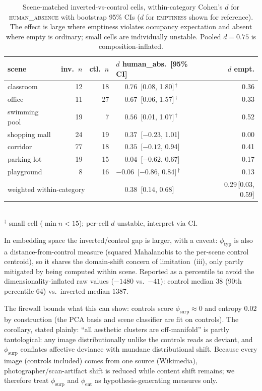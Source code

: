 \documentclass[11pt]{article}
\begin{document}
\begin{table}[htbp]
\centering
\caption{Scene-matched inverted-vs-control cells, within-category Cohen's $d$ for
\textsc{human\_absence} with bootstrap 95\% CIs ($d$ for \textsc{emptiness} shown for
reference). The effect is large where emptiness violates occupancy expectation and absent
where empty is ordinary; small cells are individually unstable. Pooled $d=0.75$ is
composition-inflated.}
\label{tab:scenematch}
\small
\begin{tabular}{lrrlr}
\toprule
scene & inv.\ $n$ & ctl.\ $n$ & $d$ human\_abs.\ [95\% CI] & $d$ empt. \\
\midrule
classroom     & 12 & 18 & $\phantom{-}0.76$ \,[0.08, 1.80]\,$^\dagger$ & 0.36 \\
office        & 11 & 27 & $\phantom{-}0.67$ \,[0.06, 1.57]\,$^\dagger$ & 0.33 \\
swimming pool & 19 & 7  & $\phantom{-}0.56$ \,[0.01, 1.07]\,$^\dagger$ & 0.52 \\
shopping mall & 24 & 19 & $\phantom{-}0.37$ \,[$-0.23$, 1.01] & 0.00 \\
corridor      & 77 & 18 & $\phantom{-}0.35$ \,[$-0.12$, 0.94] & 0.41 \\
parking lot   & 19 & 15 & $\phantom{-}0.04$ \,[$-0.62$, 0.67] & 0.17 \\
playground    & 8  & 16 & $-0.06$ \,[$-0.86$, 0.84]\,$^\dagger$ & 0.13 \\
\midrule
\multicolumn{3}{l}{weighted within-category} & $\phantom{-}0.38$ \,[0.14, 0.68] & 0.29\,[0.03, 0.59] \\
\bottomrule
\end{tabular}\\[2pt]
{\footnotesize $^\dagger$ small cell ($\min n<15$); per-cell $d$ unstable, interpret via CI.}
\end{table}

In embedding space the inverted/control gap is larger, with a caveat:
$\phi_{\text{typ}}$ is also a distance-from-control measure (squared Mahalanobis to the
per-scene control centroid), so it shares the domain-shift concern of
limitation~(iii), only partly mitigated by being computed within scene. Reported as a
percentile to avoid the dimensionality-inflated raw values ($-1480$ vs.\ $-41$): control
median $38$ (90th percentile $64$) vs.\ inverted median $1387$.

The firewall bounds what this can show: controls score
$\phi_{\text{surp}}\approx0$ and entropy $0.02$ by construction (the PCA basis and scene
classifier are fit on controls). The corollary, stated plainly: ``all aesthetic clusters
are off-manifold'' is partly tautological: any image distributionally unlike the controls
reads as deviant, and $\phi_{\text{surp}}$ conflates affective deviance with mundane
distributional shift. Because every image (controls included) comes from one source
(Wikimedia), photographer/scan-artifact shift is reduced while content shift remains; we
therefore treat $\phi_{\text{surp}}$ and $\phi_{\text{ent}}$ as hypothesis-generating
measures only.
\end{document}
